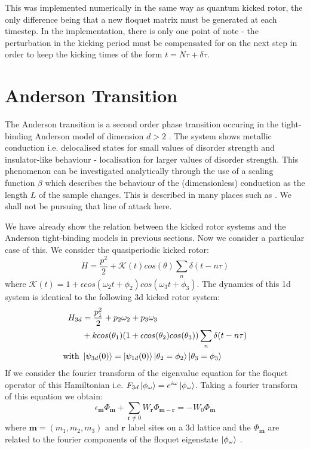 \documentclass[twocolumn,nobalancelastpage]{report}
\begin{document}
This was implemented numerically in the same way as quantum kicked rotor,
the only difference being that a new floquet matrix must be generated at
each timestep. In the implementation, there is only one point of note - the
perturbation in the kicking period must be compensated for on the next step
in order to keep the kicking times of the form $t = N\tau + \delta \tau$.

\section{Anderson Transition}
The Anderson transition is a second order phase transition occuring in the
tight-binding Anderson model of dimension $d > 2$ \cite{muller_disorder_2016}.
The system shows metallic conduction i.e. delocalised states for small values
of disorder strength and insulator-like behaviour - localisation for larger
values of disorder strength. This phenomenon can be investigated analytically
through the use of a scaling function $\beta$ which describes the behaviour
of the (dimensionless) conduction as the length $L$ of the sample changes.
This is described in many places such as \cite{muller_disorder_2016}. We
shall not be pursuing that line of attack here.

We have already show the relation between the kicked rotor systems and the
Anderson tight-binding models in previous sections. Now we consider a
particular case of this. We consider the quasiperiodic kicked rotor:
%
\begin{equation}
    H = \frac{p^2}{2} + \mathcal{K}(t) cos(\theta) \sum_n \delta(t - n\tau)
\end{equation}
%
where $\mathcal{K}(t) = 1 + \epsilon cos(\omega_2 t + \phi_2)
cos(\omega_3 t + \phi_3)$. The dynamics of this 1d system is identical
to the following 3d kicked rotor system:
%
\begin{align}
    H_{3d} &= \frac{p_1^2}{2} + p_2 \omega_2 + p_3 \omega_3\\
    &+ k cos(\theta_1) (1 + \epsilon cos(\theta_2) cos(\theta_3))
    \sum_n \delta(t - n\tau)\\
    \text{with } &\ket{\psi_{3d}(0)} = \ket{\psi_{1d}(0)}
    \ket{\theta_2 = \phi_2}\ket{\theta_3 = \phi_3}
\end{align}
%
If we consider the fourier transform of the eigenvalue equation
for the floquet operator of this Hamiltonian i.e.
$F_{3d}\ket{\phi_\omega} = e^{i\omega}\ket{\phi_\omega}$.
Taking a fourier transform of this equation we obtain:
%
\begin{equation}
    \epsilon_{\mathbf{m}} \Phi_{\mathbf{m}} + \sum_{\mathbf{r} \neq 0}
    W_{\mathbf{r}}\Phi_{\mathbf{m - r}} = -W_0 \Phi_{\mathbf{m}}
\end{equation}
%
where $\mathbf{m} = (m_1, m_2, m_3)$ and $\mathbf{r}$ label sites on
a 3d lattice and the $\Phi_{\mathbf{m}}$ are related to the fourier
components of the floquet eigenstate $\ket{\phi_\omega}$
\cite{fishman_chaos_1982}\cite{lemarie_universality_2009}.
\end{document}
